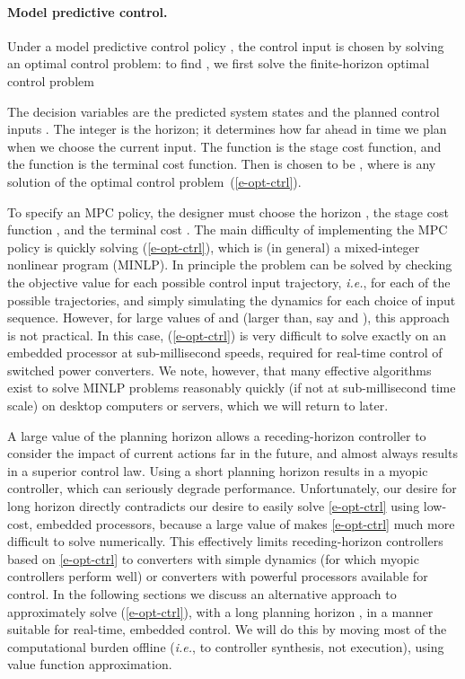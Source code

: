 \documentclass[12pt]{article}
\newcommand{\ie}{{\it i.e.}}
\begin{document}
\paragraph{Model predictive control.}


Under a model predictive control policy ,
the control input is chosen by solving an optimal control problem:
to find ,
we first solve the finite-horizon optimal control problem

The decision variables are the predicted system states 
and the planned control inputs 
.
The integer  is the horizon; it determines how far ahead in time we plan
when we choose the current input.
The function  is the stage cost function,
and the function  is the terminal cost function.
Then  is chosen to be , where  is
any solution of the optimal control problem~(\ref{e-opt-ctrl}).










To specify an MPC policy, the designer must choose the horizon ,
the stage cost function , and the terminal cost .
The main difficulty of implementing the MPC policy 
is quickly solving (\ref{e-opt-ctrl}), 
which is (in general) a mixed-integer nonlinear program (MINLP).
In principle the problem can be solved by 
checking the objective value for each possible control input trajectory,
\ie, for each of the  possible trajectories,
and simply simulating the dynamics for each choice of input sequence.
However, for large values of  and  (larger than, say  and ),
this approach is not practical.
In this case, (\ref{e-opt-ctrl}) is very difficult to solve exactly 
on an embedded processor at sub-millisecond speeds,
required for real-time control of switched power converters.
We note, however, that many effective algorithms exist
to solve MINLP problems reasonably quickly 
(if not at sub-millisecond time scale) on desktop computers or servers,
which we will return to later.



A large value of the planning horizon  allows a receding-horizon controller
to consider the impact of current actions far in the future,
and almost always results in a superior control law.
Using a short planning horizon results in a myopic controller,
which can seriously degrade performance. 
Unfortunately, our desire for long horizon directly contradicts
our desire to easily solve \eqref{e-opt-ctrl} using low-cost, embedded processors,
because a large value of  makes \eqref{e-opt-ctrl} much more difficult to solve numerically.
This effectively limits receding-horizon controllers based on \eqref{e-opt-ctrl}
to converters with simple dynamics 
(for which myopic controllers perform well)
or converters with powerful processors available for control.
In the following sections we discuss an alternative approach 
to approximately solve (\ref{e-opt-ctrl}), 
with a long planning horizon ,
in a manner suitable for real-time, embedded control.
We will do this by moving most of the computational burden offline
(\ie, to controller synthesis, not execution),
using value function approximation.
\end{document}
